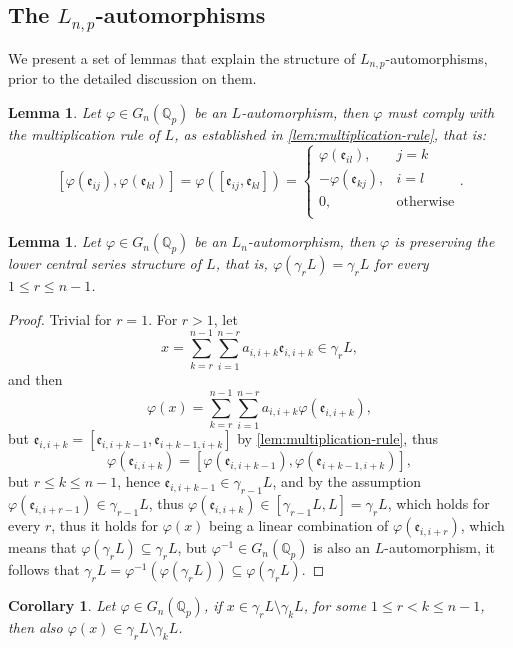 \documentclass{article}
\newtheorem{corollary}[theorem]{Corollary}
\newtheorem{lemma}[theorem]{Lemma}
\newcommand{\e}{\mathfrak{e}}
\begin{document}
\subsection{The $L_{n,p}$-automorphisms}
We present a set of lemmas that explain the structure of $L_{n,p}$-automorphisms, prior to the detailed discussion on them.
\begin{lemma}
Let $\varphi\in{G}_n(\mathbb{Q}_p)$ be an $L$-automorphism, then $\varphi$ must comply with the multiplication rule of $L$, as established in \ref{lem:multiplication-rule}, that is: \[[\varphi(\e_{ij}),\varphi(\e_{kl})]=\varphi([\e_{ij},\e_{kl}])=\begin{cases}
\varphi(\e_{il}),&j=k\\
-\varphi(\e_{kj}),&i=l\\
0,&\text{otherwise}\\
\end{cases}.\]
\end{lemma}
\begin{lemma}
\label{lem:derived-filtration}
Let $\varphi\in{G}_n(\mathbb{Q}_p)$ be an $L_n$-automorphism, then $\varphi$ is preserving the lower central series structure of ${L}$, that is, $\varphi(\gamma_r{L})=\gamma_r{L}$ for every $1\leq{r}\leq{n}-1$.
\end{lemma}
\begin{proof}
Trivial for $r=1$.
For $r>1$, let \[x=\sum_{k=r}^{n-1}\sum_{i=1}^{n-r}a_{i,i+k}\e_{i,i+k}\in\gamma_r{L},\]
and then
\[
\varphi(x)=\sum_{k=r}^{n-1}\sum_{i=1}^{n-r}a_{i,i+k}\varphi(\e_{i,i+k})
,\]
but $\e_{i,i+k}=[\e_{i,i+k-1},\e_{i+k-1,i+k}]$ by \ref{lem:multiplication-rule}, thus \[\varphi(\e_{i,i+k})=[\varphi(\e_{i,i+k-1}),\varphi(\e_{i+k-1,i+k})],\] 
but $r\leq{k}\leq{n-1}$, hence $\e_{i,i+k-1}\in\gamma_{r-1}{L}$,
and by the assumption $\varphi(\e_{i,i+r-1})\in\gamma_{r-1}{L}$, thus $\varphi(\e_{i,i+k})\in[\gamma_{r-1}{L},{L}]=\gamma_r{L}$, which holds for every $r$, thus it holds for $\varphi(x)$ being a linear combination of $\varphi(\e_{i,i+r})$, which means that $\varphi(\gamma_r{L})\subseteq\gamma_r{L}$, but $\varphi^{-1}\in{G}_n(\mathbb{Q}_p)$ is also an ${L}$-automorphism, it follows that $\gamma_r{L}=\varphi^{-1}(\varphi(\gamma_r{L}))\subseteq\varphi(\gamma_r{L})$.
\end{proof}
\begin{corollary}
\label{cor:main-diag-block}
Let $\varphi\in{G}_n(\mathbb{Q}_p)$, if $x\in\gamma_r{L}\setminus\gamma_k{L}$, for some $1\leq{r}<k\leq{n-1}$, then also $\varphi(x)\in\gamma_r{L}\setminus\gamma_k{L}$.
\end{corollary}
\end{document}
